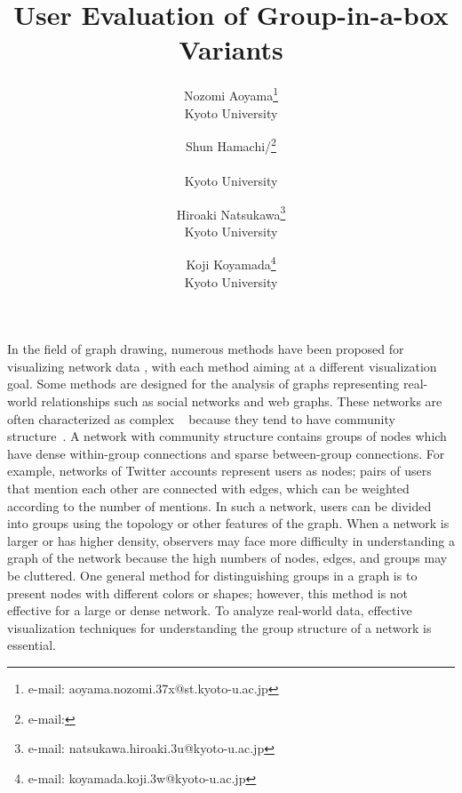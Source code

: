 \documentclass{vgtc}                          %
\title{User Evaluation of Group-in-a-box Variants}
\author{Nozomi Aoyama\thanks{e-mail: aoyama.nozomi.37x@st.kyoto-u.ac.jp}\\ %
  \scriptsize Kyoto University %
\and Shun Hamachi/\thanks{e-mail: }\\ %
  \parbox{1.4in}{\scriptsize \centering Kyoto University}%
\and Hiroaki Natsukawa\thanks{e-mail: natsukawa.hiroaki.3u@kyoto-u.ac.jp}\\ %
  \scriptsize Kyoto University
\and Koji Koyamada\thanks{e-mail: koyamada.koji.3w@kyoto-u.ac.jp}\\ %
  \scriptsize Kyoto University}
\begin{document}


\maketitle

In the field of graph drawing, numerous methods have been proposed for visualizing network data \cite{Vehlow2017VisualizingGS,doi:10.1177/1473871612455749, saket2014group}, with each method aiming at a different visualization goal.
Some methods are designed for the analysis of graphs representing real-world relationships such as social networks and web graphs.
These networks are often characterized as complex ~\cite{Newman:2010:NI:1809753} because they tend to have community structure~\cite{girvan2002community,newman2004detecting}.
A network with community structure contains groups of nodes which have dense within-group connections and sparse between-group connections.
For example, networks of Twitter accounts represent users as nodes; pairs of users that mention each other are connected with edges, which can be weighted according to the number of mentions.
In such a network, users can be divided into groups using the topology or other features of the graph.
When a network is larger or has higher density, observers may face more difficulty in understanding a graph of the network because the high numbers of nodes, edges, and groups may be cluttered.
One general method for distinguishing groups in a graph is to present nodes with different colors or shapes; however, this method is not effective for a large or dense network.
To analyze real-world data, effective visualization techniques for understanding the group structure of a network is essential.
\end{document}
